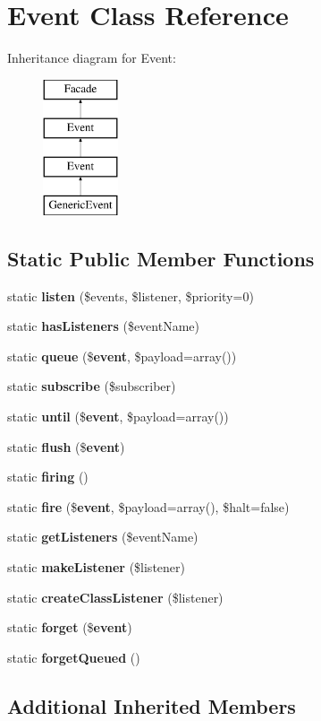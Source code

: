\section{Event Class Reference}
\label{class_event}
Inheritance diagram for Event\+:\begin{figure}[H]
\begin{center}
\leavevmode
\includegraphics[height=4.000000cm]{class_event}
\end{center}
\end{figure}
\subsection*{Static Public Member Functions}
\begin{DoxyCompactItemize}
\item 
static {\bf listen} (\$events, \$listener, \$priority=0)
\item 
static {\bf has\+Listeners} (\$event\+Name)
\item 
static {\bf queue} (\${\bf event}, \$payload=array())
\item 
static {\bf subscribe} (\$subscriber)
\item 
static {\bf until} (\${\bf event}, \$payload=array())
\item 
static {\bf flush} (\${\bf event})
\item 
static {\bf firing} ()
\item 
static {\bf fire} (\${\bf event}, \$payload=array(), \$halt=false)
\item 
static {\bf get\+Listeners} (\$event\+Name)
\item 
static {\bf make\+Listener} (\$listener)
\item 
static {\bf create\+Class\+Listener} (\$listener)
\item 
static {\bf forget} (\${\bf event})
\item 
static {\bf forget\+Queued} ()
\end{DoxyCompactItemize}
\subsection*{Additional Inherited Members}


